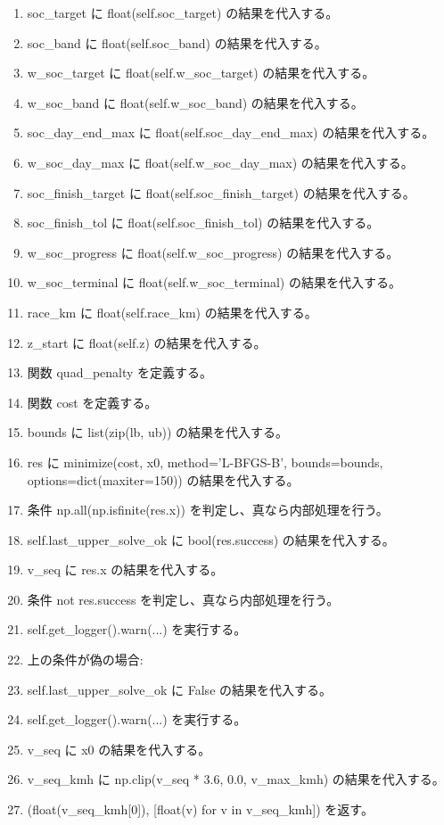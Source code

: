 \documentclass[a4paper,11pt]{article}
\begin{document}
\begin{enumerate}[leftmargin=1.8em]
\item soc\_target に float(self.soc\_target) の結果を代入する。
\item soc\_band に float(self.soc\_band) の結果を代入する。
\item w\_soc\_target に float(self.w\_soc\_target) の結果を代入する。
\item w\_soc\_band に float(self.w\_soc\_band) の結果を代入する。
\item soc\_day\_end\_max に float(self.soc\_day\_end\_max) の結果を代入する。
\item w\_soc\_day\_max に float(self.w\_soc\_day\_max) の結果を代入する。
\item soc\_finish\_target に float(self.soc\_finish\_target) の結果を代入する。
\item soc\_finish\_tol に float(self.soc\_finish\_tol) の結果を代入する。
\item w\_soc\_progress に float(self.w\_soc\_progress) の結果を代入する。
\item w\_soc\_terminal に float(self.w\_soc\_terminal) の結果を代入する。
\item race\_km に float(self.race\_km) の結果を代入する。
\item z\_start に float(self.z) の結果を代入する。
\item 関数 quad\_penalty を定義する。
\item 関数 cost を定義する。
\item bounds に list(zip(lb, ub)) の結果を代入する。
\item res に minimize(cost, x0, method='L-BFGS-B', bounds=bounds, options=dict(maxiter=150)) の結果を代入する。
\item 条件 np.all(np.isfinite(res.x)) を判定し、真なら内部処理を行う。
\item   self.last\_upper\_solve\_ok に bool(res.success) の結果を代入する。
\item   v\_seq に res.x の結果を代入する。
\item   条件 not res.success を判定し、真なら内部処理を行う。
\item     self.get\_logger().warn(...) を実行する。
\item   上の条件が偽の場合:
\item   self.last\_upper\_solve\_ok に False の結果を代入する。
\item   self.get\_logger().warn(...) を実行する。
\item   v\_seq に x0 の結果を代入する。
\item v\_seq\_kmh に np.clip(v\_seq * 3.6, 0.0, v\_max\_kmh) の結果を代入する。
\item (float(v\_seq\_kmh[0]), [float(v) for v in v\_seq\_kmh]) を返す。
            \end{enumerate}
\end{document}
